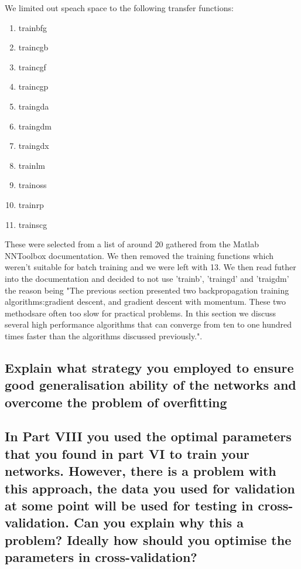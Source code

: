 \documentclass[11pt]{article}
\begin{document}
We limited out speach space to the following transfer functions:
\begin{enumerate}
  \item trainbfg
  \item traincgb
  \item traincgf
  \item traincgp
  \item traingda
  \item traingdm
  \item traingdx
  \item trainlm
  \item trainoss
  \item trainrp
  \item trainscg 
\end{enumerate}

These were selected from a list of around 20 gathered from the Matlab NNToolbox documentation. We then removed the training functions which weren't suitable for batch training and we were left with 13. We then read futher into the documentation and decided to not use 'trainb', 'traingd' and 'traigdm' the reason being "The previous section presented two backpropagation training algorithms:gradient descent, and gradient descent with momentum. These two methodsare often too slow for practical problems. In this section we discuss several high performance algorithms that can converge from ten to one hundred times faster than the algorithms discussed previously.".




\subsection{Explain what strategy you employed to ensure good generalisation ability of the networks and overcome the problem of overfitting}

\subsection{In Part VIII you used the optimal parameters that you found in part VI to train your networks. However, there is a problem with this approach, the data you used for validation at some point will be used for testing in cross-validation. Can you explain why this a problem? Ideally how should you optimise the parameters in cross-validation?}
\end{document}
